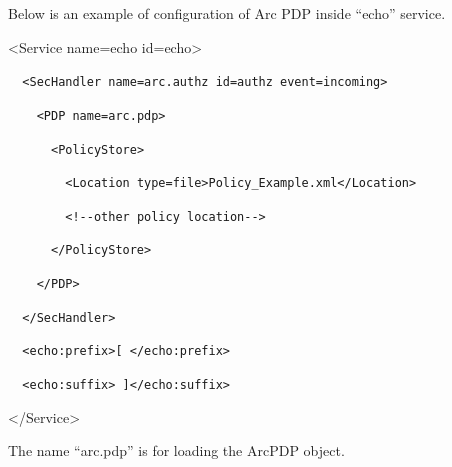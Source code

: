 \documentclass{article}
\begin{document}
{\upshape\color{black}
Below is an example of configuration of Arc PDP inside
{\textquotedblleft}echo{\textquotedblright} service.}

{\ttfamily\color{black}
{\textless}Service name={\textquotedbl}echo{\textquotedbl}
id={\textquotedbl}echo{\textquotedbl}{\textgreater}}

{\upshape\color{black}
\foreignlanguage{spanish}{\texttt{\ \ }}\texttt{{\textless}SecHandler
name={\textquotedbl}arc.authz{\textquotedbl}
id={\textquotedbl}authz{\textquotedbl}
event={\textquotedbl}incoming{\textquotedbl}{\textgreater}}}

{\upshape\color{black}
\texttt{\ \ \ \ {\textless}PDP
name={\textquotedbl}arc.pdp{\textquotedbl}{\textgreater}}}

{\upshape\color{black}
\texttt{\ \ \ \ \ \ {\textless}PolicyStore{\textgreater}}}

{\upshape\color{black}
\texttt{\ \ \ \ \ \ \ \ {\textless}Location
type={\textquotedbl}file{\textquotedbl}{\textgreater}Policy\_Example.xml{\textless}/Location{\textgreater}}}

{\upshape\color{black}
\texttt{\ \ \ \ \ \ \ \ {\textless}!-{}-other policy
location-{}-{\textgreater}}}

{\upshape\color{black}
\texttt{\ \ \ \ \ \ {\textless}/PolicyStore{\textgreater}}}

{\upshape\color{black}
\texttt{\ \ \ \ {\textless}/PDP{\textgreater}}}

{\upshape\color{black}
\texttt{\ \ }\foreignlanguage{spanish}{\texttt{{\textless}/SecHandler{\textgreater}}}}

{\upshape\color{black}
\foreignlanguage{spanish}{\texttt{\ \ }}\foreignlanguage{spanish}{\texttt{{\textless}echo:prefix{\textgreater}[
{\textless}/echo:prefix{\textgreater}}}}

{\upshape\color{black}
\foreignlanguage{spanish}{\texttt{\ \ }}\texttt{{\textless}echo:suffix{\textgreater}
]{\textless}/echo:suffix{\textgreater}}}

{\ttfamily\color{black}
{\textless}/Service{\textgreater}}

{\color{black}
The name {\textquotedblleft}arc.pdp{\textquotedblright} is for loading
the ArcPDP object.}
\end{document}
